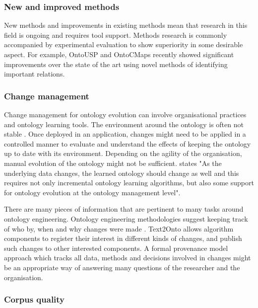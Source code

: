 \documentclass[a4paper]{report}
\begin{document}
\subsubsection{New and improved methods}

New methods and improvements in existing methods mean that research in this field is ongoing and requires tool support.
Methods research is commonly accompanied by experimental evaluation to show superiority in some desirable aspect\cite{Basili96Experi}.
For example, OntoUSP and OntoCMaps recently showed significant improvements over the state of the art using novel methods of identifying important relations.


\subsubsection{Change management}

Change management for ontology evolution can involve organisational practices and ontology learning tools.
The environment around the ontology is often not stable \cite{Blomqvist09Thesis}.
Once deployed in an application, changes might need to be applied in a controlled manner to evaluate and understand the effects of keeping the ontology up to date with its environment\cite{HOO2009OntEngMeth}.
Depending on the agility of the organisation, manual evolution of the ontology might not be sufficient\cite{Blomqvist09Thesis}.
\cite{Cimiano2009OL} states "As the underlying data changes, the learned ontology should change as well and this requires not only incremental ontology learning algorithms, but also some support for ontology evolution at the ontology management level".

There are many pieces of information that are pertinent to many tasks around ontology engineering.
Ontology engineering methodologies suggest keeping track of who by, when and why changes were made \cite{HOO2009OntEngMeth}.
Text2Onto allows algorithm components to register their interest in different kinds of changes, and publish such changes to other interested components\cite{Cimiano2005Text2Onto}.
A formal provenance model approach\citep{Groth09PipeProv} which tracks all data, methods and decisions involved in changes might be an appropriate way of answering many questions of the researcher and the organisation.

\subsubsection{Corpus quality}
\end{document}
